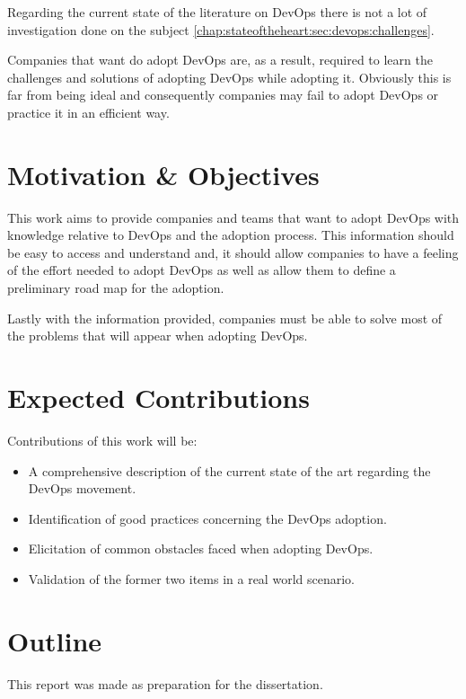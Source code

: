 		Regarding the current state of the literature on DevOps there is not a lot of investigation done on the subject \ref{chap:stateoftheheart:sec:devops:challenges}. 

		Companies that want do adopt DevOps are, as a result, required to learn the challenges and solutions of adopting DevOps while adopting it. Obviously this is far from being ideal and consequently companies may fail to adopt DevOps or practice it in an efficient way.

		   
	\section{Motivation \& Objectives} \label{chap:introduction:sec:motivation}

	    This work aims to provide companies and teams that want to adopt DevOps with knowledge relative to DevOps and the adoption process. This information should be easy to access and understand and, it should allow companies to have a feeling of the effort needed to adopt DevOps as well as allow them to define a preliminary road map for the adoption. 
	    
	    Lastly with the information provided, companies must be able to solve most of the problems that will appear when adopting DevOps.

    \section{Expected Contributions} \label{chap:introduction:sec:contributions}

    	Contributions of this work will be:
    	\begin{itemize}
    		\item{A comprehensive description of the current state of the art regarding the DevOps movement.}
    		\item{Identification of good practices concerning the DevOps adoption.}
    		\item{Elicitation of common obstacles faced when adopting DevOps.}
    		\item{Validation of the former two items in a real world scenario.}
    	\end{itemize}

    \section{Outline} \label{chap:introduction:sec:outline}
    	This report was made as preparation for the dissertation.

